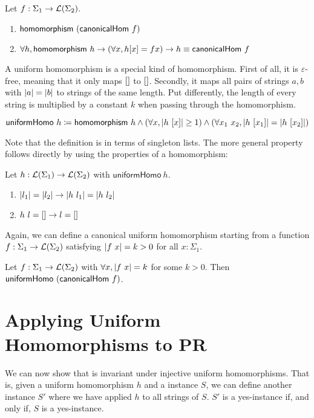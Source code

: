 \begin{proposition}
  Let $f : \Sigma_1 \rightarrow \mathcal{L} (\Sigma_2)$. 
  \begin{enumerate}
    \item $\textsf{homomorphism}~(\textsf{canonicalHom}~f)$
    \item $\forall h, \textsf{homomorphism}~h \rightarrow (\forall x, h [x] = f x) \rightarrow h \equiv \textsf{canonicalHom}~f$
  \end{enumerate}
\end{proposition}

A uniform homomorphism is a special kind of homomorphism. First of all, it is $\varepsilon$-free, meaning that it only maps $[]$ to $[]$. Secondly, it maps all pairs of strings $a, b$ with $|a| = |b|$ to strings of the same length. 
Put differently, the length of every string is multiplied by a constant $k$ when passing through the homomorphism. 

\newcommand{\uniformHomo}{\textsf{uniformHomo}}
\begin{definition}
  \[\uniformHomo~h \defeq \homomorphism~h \land (\forall x, \length{h~[x]} \ge 1) \land (\forall x_1~x_2, \length{h~[x_1]} = \length{h~[x_2]})\]
\end{definition}
Note that the definition is in terms of singleton lists. The more general property follows directly by using the properties of a homomorphism:
\begin{proposition}
  Let $h : \mathcal{L} (\Sigma_1) \rightarrow \mathcal{L} (\Sigma_2)$ with $\uniformHomo~h$.
  \begin{enumerate}
    \item $|l_1| = |l_2| \rightarrow |h~l_1| = |h~l_2|$
    \item $h~l = [] \rightarrow l = []$
  \end{enumerate}
\end{proposition}

Again, we can define a canonical uniform homomorphism starting from a function $f : \Sigma_1 \rightarrow \mathcal{L} (\Sigma_2)$ satisfying $|f~x| = k > 0$ for all $x : \Sigma_1$. 
\begin{proposition}
  Let $f : \Sigma_1 \rightarrow \mathcal{L} (\Sigma_2)$ with $\forall x, |f~x| = k$ for some $k > 0$. 
  Then $\uniformHomo~(\canonicalHom~f)$. 
\end{proposition}

\section{Applying Uniform Homomorphisms to PR}
We can now show that \PR{} is invariant under injective uniform homomorphisms. That is, given a uniform homomorphism $h$ and a \PR{} instance $S$, we can define another \PR{} instance $S'$ where we have applied $h$ to all strings of $S$. $S'$ is a yes-instance if, and only if, $S$ is a yes-instance. 


